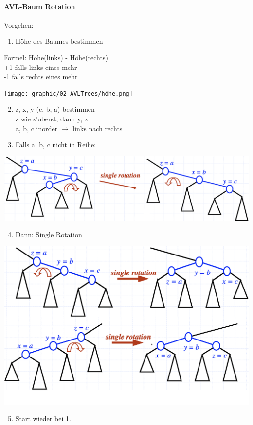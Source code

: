 \paragraph{AVL-Baum Rotation}
Vorgehen:
\begin{enumerate}
    \item Höhe des Baumes bestimmen
\end{enumerate}
Formel: Höhe(links) - Höhe(rechts)\\
+1 falls links eines mehr\\
-1 falls rechts eines mehr
\begin{center}
    \texttt{[image: graphic/02 AVLTrees/höhe.png]}
\end{center}
\begin{enumerate}
    \setcounter{enumi}{1}
    \item z, x, y (c, b, a) bestimmen\\
    z wie z'oberst, dann y, x\\
    a, b, c inorder $\rightarrow$ links nach rechts
    \item Falls a, b, c nicht in Reihe:
\end{enumerate}
\begin{center}
    \includegraphics[width=\linewidth]{graphic/02 AVLTrees/doppel_rot.png}
\end{center}
\begin{enumerate}
    \setcounter{enumi}{3}
    \item Dann: Single Rotation
\end{enumerate}
\begin{center}
    \includegraphics[width=\linewidth]{graphic/02 AVLTrees/single_rot.png}
\end{center}
\begin{enumerate}
    \setcounter{enumi}{4}
    \item Start wieder bei 1.
\end{enumerate}




